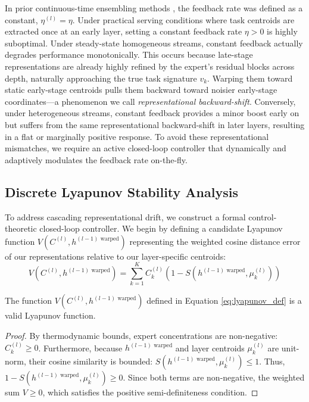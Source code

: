 In prior continuous-time ensembling methods \cite{chemmerge2025}, the feedback rate was defined as a constant, $\eta^{(l)} = \eta$. Under practical serving conditions where task centroids are extracted once at an early layer, setting a constant feedback rate $\eta > 0$ is highly suboptimal. Under steady-state homogeneous streams, constant feedback actually degrades performance monotonically. This occurs because late-stage representations are already highly refined by the expert's residual blocks across depth, naturally approaching the true task signature $v_k$. Warping them toward static early-stage centroids pulls them backward toward noisier early-stage coordinates—a phenomenon we call \emph{representational backward-shift}. Conversely, under heterogeneous streams, constant feedback provides a minor boost early on but suffers from the same representational backward-shift in later layers, resulting in a flat or marginally positive response. To avoid these representational mismatches, we require an active closed-loop controller that dynamically and adaptively modulates the feedback rate on-the-fly.

\subsection{Discrete Lyapunov Stability Analysis}
To address cascading representational drift, we construct a formal control-theoretic closed-loop controller. We begin by defining a candidate Lyapunov function $V(C^{(l)}, h^{(l-1) \text{ warped}})$ representing the weighted cosine distance error of our representations relative to our layer-specific centroids:
\begin{equation}
V(C^{(l)}, h^{(l-1) \text{ warped}}) = \sum_{k=1}^K C_k^{(l)} \left( 1 - S(h^{(l-1) \text{ warped}}, \mu_k^{(l)}) \right)
\label{eq:lyapunov_def}
\end{equation}

\begin{proposition}
The function $V(C^{(l)}, h^{(l-1) \text{ warped}})$ defined in Equation \eqref{eq:lyapunov_def} is a valid Lyapunov function.
\end{proposition}
\begin{proof}
By thermodynamic bounds, expert concentrations are non-negative: $C_k^{(l)} \ge 0$. Furthermore, because $h^{(l-1) \text{ warped}}$ and layer centroids $\mu_k^{(l)}$ are unit-norm, their cosine similarity is bounded: $S(h^{(l-1) \text{ warped}}, \mu_k^{(l)}) \le 1$. Thus, $1 - S(h^{(l-1) \text{ warped}}, \mu_k^{(l)}) \ge 0$. Since both terms are non-negative, the weighted sum $V \ge 0$, which satisfies the positive semi-definiteness condition.
\end{proof}

